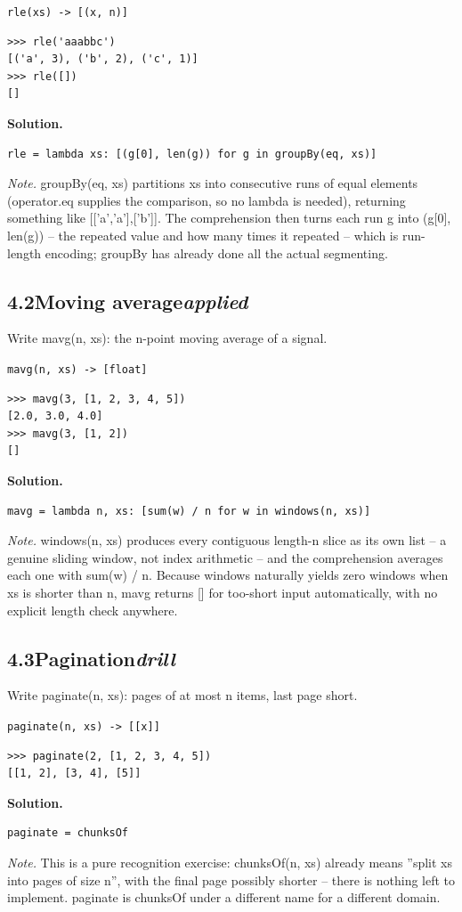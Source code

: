 \documentclass[10pt,letterpaper]{book}
\begin{document}
\noindent\texttt{rle(xs) -> [(x, n)]}
\begin{lstlisting}[style=ex]
>>> rle('aaabbc')
[('a', 3), ('b', 2), ('c', 1)]
>>> rle([])
[]
\end{lstlisting}
\noindent\textbf{Solution.}
\begin{lstlisting}[style=code]
rle = lambda xs: [(g[0], len(g)) for g in groupBy(eq, xs)]
\end{lstlisting}
\noindent\textit{Note.} groupBy(eq, xs) partitions xs into consecutive runs of equal elements (operator.eq supplies the comparison, so no lambda is needed), returning something like [['a','a'],['b']]. The comprehension then turns each run g into (g[0], len(g)) -- the repeated value and how many times it repeated -- which is run-length encoding; groupBy has already done all the actual segmenting.

\subsection*{4.2\quad Moving average\hfill\textnormal{\textit{applied}}}
Write mavg(n, xs): the n-point moving average of a signal.

\noindent\texttt{mavg(n, xs) -> [float]}
\begin{lstlisting}[style=ex]
>>> mavg(3, [1, 2, 3, 4, 5])
[2.0, 3.0, 4.0]
>>> mavg(3, [1, 2])
[]
\end{lstlisting}
\noindent\textbf{Solution.}
\begin{lstlisting}[style=code]
mavg = lambda n, xs: [sum(w) / n for w in windows(n, xs)]
\end{lstlisting}
\noindent\textit{Note.} windows(n, xs) produces every contiguous length-n slice as its own list -- a genuine sliding window, not index arithmetic -- and the comprehension averages each one with sum(w) / n. Because windows naturally yields zero windows when xs is shorter than n, mavg returns [] for too-short input automatically, with no explicit length check anywhere.

\subsection*{4.3\quad Pagination\hfill\textnormal{\textit{drill}}}
Write paginate(n, xs): pages of at most n items, last page short.

\noindent\texttt{paginate(n, xs) -> [[x]]}
\begin{lstlisting}[style=ex]
>>> paginate(2, [1, 2, 3, 4, 5])
[[1, 2], [3, 4], [5]]
\end{lstlisting}
\noindent\textbf{Solution.}
\begin{lstlisting}[style=code]
paginate = chunksOf
\end{lstlisting}
\noindent\textit{Note.} This is a pure recognition exercise: chunksOf(n, xs) already means ''split xs into pages of size n'', with the final page possibly shorter -- there is nothing left to implement. paginate is chunksOf under a different name for a different domain.
\end{document}

